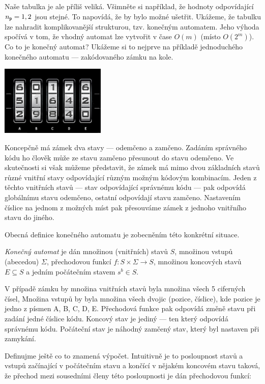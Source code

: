 Naše tabulka je ale příliš veliká. Všimněte si například, že hodnoty odpovídající
\(n_{\tt p} = 1,2\) jsou stejné.  To napovídá, že by bylo možné ušetřit. Ukážeme,
že tabulku lze nahradit komplikovanější strukturou, tzv. konečným automatem.
Jeho výhoda spočívá v tom, že vhodný automat  lze vytvořit v čase \(O(m)\)
(místo \(O(2^{m})\)). Co to je konečný automat?  Ukážeme si to nejprve na příkladě
jednoduchého konečného automatu --- zakódovaného zámku na kole.

\begin{center}
 \includegraphics[width=5cm]{combination-lock}
\end{center}

Koncepčně má zámek dva stavy --- odemčeno a zamčeno.  Zadáním správného kódu
ho člověk může ze stavu zamčeno přesunout
do stavu odemčeno.  Ve skutečnosti si však můžeme představit, že zámek má mimo
dvou základních stavů různé vnitřní stavy odpovídající různým možným kódovým
kombinacím. Jeden z těchto vnitřních stavů --- stav odpovídající správnému kódu ---
pak odpovídá globálnímu stavu odemčeno, ostatní odpovídají stavu zamčeno.
Nastavením číslice na jednom z možných míst pak přesouváme zámek z jednoho
vnitřního stavu do jiného.

Obecná definice konečného automatu je zobecněním této konkrétní situace.

\begin{definition} \emph{Konečný automat} je dán množinou (vnitřních) stavů \(S\),
množinou vstupů (abecedou) \(\Sigma\), přechodovou funkcí \(f:S\times\Sigma\to S\),
množinou koncových stavů \(E\subseteq S\) a jedním počátečním stavem \(s^b\in S\).
\end{definition}

V případě zámku by množina vnitřních stavů byla množina všech 5 ciferných čísel,
Množina vstupů by byla množina všech dvojic (pozice, číslice), kde pozice je jedno z
písmen A, B, C, D, E. Přechodová funkce pak odpovídá změně stavu při zadání jedné
číslice kódu. Koncový stav je jediný --- ten který odpovídá správnému kódu.
Počáteční stav je náhodný zamčený stav, který byl nastaven při zamykání.

Definujme ještě co to znamená výpočet. Intuitivně je to posloupnost stavů a vstupů
začínající v počátečním stavu a končící v nějakém koncovém stavu taková, že přechod
mezi sousedními členy této posloupnosti je dán přechodovou funkcí:

